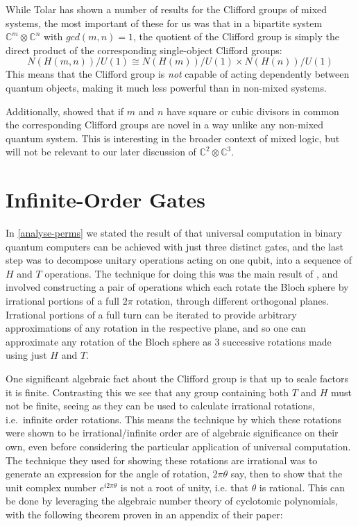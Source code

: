 While Tolar has shown a number of results for the Clifford groups of mixed systems, the most important of these for us was that in a bipartite system $\mathbb{C}^m \otimes \mathbb{C}^n$ with $gcd(m, n) = 1$, the quotient of the Clifford group is simply the direct product of the corresponding single-object Clifford groups:
\[N(H(m, n))/U(1) \cong N(H(m))/U(1) \times N(H(n))/U(1) \]
This means that the Clifford group is \emph{not} capable of acting dependently between quantum objects, making it much less powerful than in non-mixed systems.

Additionally, \cite{tolar-clifford} showed that if $m$ and $n$ have square or cubic divisors in common the corresponding Clifford groups are novel in a way unlike any non-mixed quantum system. This is interesting in the broader context of mixed logic, but will not be relevant to our later discussion of $\mathbb{C}^2 \otimes \mathbb{C}^3$.

\section{Infinite-Order Gates}\label{infinite-order}
In \autoref{analyse-perms} we stated the result of \cite{universal-qubit} that universal computation in binary quantum computers can be achieved with just three distinct gates, and the last step was to decompose unitary operations acting on one qubit, into a sequence of $H$ and $T$ operations. The technique for doing this was the main result of \cite{universal-qubit}, and involved constructing a pair of operations which each rotate the Bloch sphere by irrational portions of a full $2\pi$ rotation, through different orthogonal planes. Irrational portions of a full turn can be iterated to provide arbitrary approximations of any rotation in the respective plane, and so one can approximate any rotation of the Bloch sphere as 3 successive rotations made using just $H$ and $T$.

One significant algebraic fact about the Clifford group is that up to scale factors it is finite. Contrasting this we see that any group containing both $T$ and $H$ must not be finite, seeing as they can be used to calculate irrational rotations, i.e.\ infinite order rotations. This means the technique by which these rotations were shown to be irrational/infinite order are of algebraic significance on their own, even before considering the particular application of universal computation. The technique they used for showing these rotations are irrational was to generate an expression for the angle of rotation, $2\pi \theta$ say, then to show that the unit complex number $e^{i2\pi \theta}$ is not a root of unity, i.e. that $\theta$ is rational. This can be done by leveraging the algebraic number theory of cyclotomic polynomials, with the following theorem proven in an appendix of their paper:


